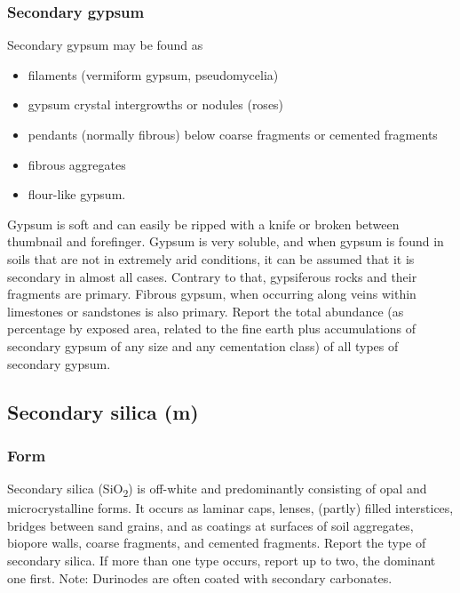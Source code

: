 \documentclass[
  letterpaper,
  DIV=11,
  numbers=noendperiod]{scrreprt}
\providecommand{\tightlist}{%
  \setlength{\itemsep}{0pt}\setlength{\parskip}{0pt}}\usepackage{longtable,booktabs,array}
\begin{document}
\hypertarget{secondary-gypsum}{%
\subsubsection{Secondary gypsum}\label{secondary-gypsum}}

Secondary gypsum may be found as

\begin{itemize}
\tightlist
\item
  filaments (vermiform gypsum, pseudomycelia)
\item
  gypsum crystal intergrowths or nodules (roses)
\item
  pendants (normally fibrous) below coarse fragments or cemented
  fragments
\item
  fibrous aggregates
\item
  flour-like gypsum.
\end{itemize}

Gypsum is soft and can easily be ripped with a knife or broken between
thumbnail and forefinger. Gypsum is very soluble, and when gypsum is
found in soils that are not in extremely arid conditions, it can be
assumed that it is secondary in almost all cases. Contrary to that,
gypsiferous rocks and their fragments are primary. Fibrous gypsum, when
occurring along veins within limestones or sandstones is also primary.
Report the total abundance (as percentage by exposed area, related to
the fine earth plus accumulations of secondary gypsum of any size and
any cementation class) of all types of secondary gypsum.

\hypertarget{secondary-silica-m}{%
\subsection{Secondary silica (m)}\label{secondary-silica-m}}

\hypertarget{form}{%
\subsubsection{Form}\label{form}}

Secondary silica (SiO\textsubscript{2}) is off-white and predominantly
consisting of opal and microcrystalline forms. It occurs as laminar
caps, lenses, (partly) filled interstices, bridges between sand grains,
and as coatings at surfaces of soil aggregates, biopore walls, coarse
fragments, and cemented fragments. Report the type of secondary silica.
If more than one type occurs, report up to two, the dominant one first.
Note: Durinodes are often coated with secondary carbonates.
\end{document}
